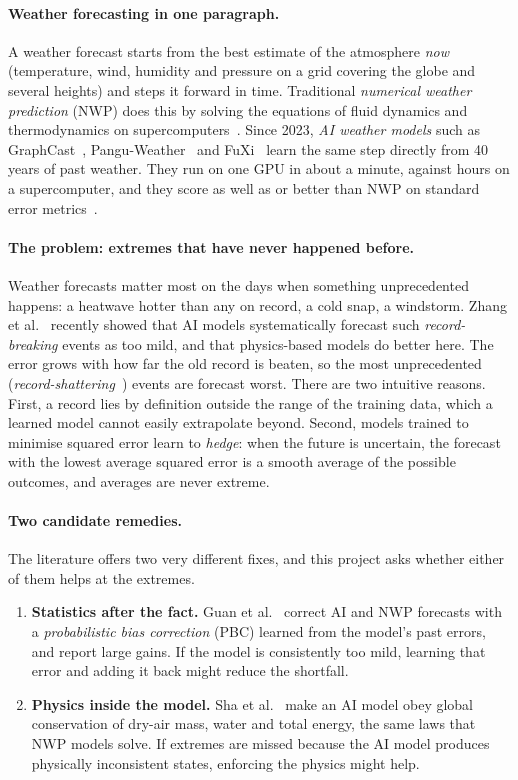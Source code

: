 \documentclass{article}
\begin{document}
\paragraph{Weather forecasting in one paragraph.}
A weather forecast starts from the best estimate of the atmosphere \emph{now} (temperature, wind,
humidity and pressure on a grid covering the globe and several heights) and steps it forward in
time. Traditional \emph{numerical weather prediction} (NWP) does this by solving the equations of
fluid dynamics and thermodynamics on supercomputers~\cite{bauer2015quiet}. Since 2023, \emph{AI weather models}
such as GraphCast~\cite{lam2023graphcast}, Pangu-Weather~\cite{bi2023pangu} and FuXi~\cite{chen2023fuxi}
learn the same step directly from 40 years of past weather. They run on one GPU in about a minute, against hours
on a supercomputer, and they score as well as or better than NWP on standard error metrics~\cite{rasp2024wb2,benbouallegue2024rise}.

\paragraph{The problem: extremes that have never happened before.}
Weather forecasts matter most on the days when something unprecedented happens: a heatwave hotter than any on
record, a cold snap, a windstorm. Zhang et al.~\cite{zhang2026records} recently showed that AI models
systematically forecast such \emph{record-breaking} events as too mild, and that physics-based models do
better here. The error grows with how far the old record is beaten, so the most unprecedented
(\emph{record-shattering}~\cite{fischer2021shattering}) events are forecast worst.
There are two intuitive reasons. First, a record lies by definition outside the range of the training data,
which a learned model cannot easily extrapolate beyond. Second, models trained to minimise squared error learn
to \emph{hedge}: when the future is uncertain, the forecast with the lowest average squared error is a smooth
average of the possible outcomes, and averages are never extreme.

\paragraph{Two candidate remedies.}
The literature offers two very different fixes, and this project asks whether either of them helps at the extremes.
\begin{enumerate}[leftmargin=*]
  \item \textbf{Statistics after the fact.} Guan et al.~\cite{guan2026pbc} correct AI and NWP forecasts with a
  \emph{probabilistic bias correction} (PBC) learned from the model's past errors, and report large gains.
  If the model is consistently too mild, learning that error and adding it back might reduce the shortfall.
  \item \textbf{Physics inside the model.} Sha et al.~\cite{sha2025conservation} make an AI model obey global
  conservation of dry-air mass, water and total energy, the same laws that NWP models solve.
  If extremes are missed because the AI model produces physically inconsistent states, enforcing the
  physics might help.
\end{enumerate}
\end{document}
